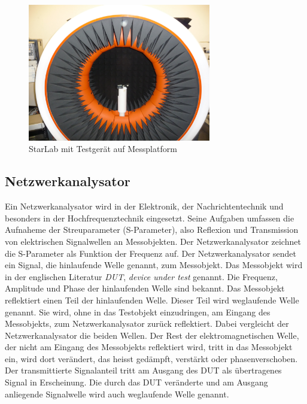 \begin{figure}[!h]
	\centering
	\includegraphics[width=8cm]{content/bilder/Implementierung/StarLab.JPG}%
	\caption{StarLab mit Testgerät auf Messplatform}
	\label{fig:StarLab}
\end{figure}

\subsection{Netzwerkanalysator}
Ein Netzwerkanalysator wird in der Elektronik, der Nachrichtentechnik und besonders in der Hochfrequenztechnik eingesetzt. Seine Aufgaben umfassen die Aufnaheme der Streuparameter (S-Parameter), also Reflexion und Transmission von elektrischen Signalwellen an Messobjekten. Der Netzwerkanalysator zeichnet die S-Parameter als Funktion der Frequenz auf. Der Netzwerkanalysator sendet ein Signal, die  hinlaufende Welle genannt, zum  Messobjekt. Das Messobjekt wird in der englischen Literatur  \textit{DUT}, \textit{device under test} genannt. Die  Frequenz, Amplitude und Phase der hinlaufenden Welle sind bekannt. Das Messobjekt reflektiert einen Teil der hinlaufenden Welle. Dieser Teil wird weglaufende Welle genannt. Sie wird, ohne in das Testobjekt einzudringen, am Eingang des Messobjekts, zum Netzwerkanalysator zurück reflektiert. Dabei vergleicht der Netzwerkanalysator die beiden Wellen. Der Rest der elektromagnetischen Welle, der nicht am Eingang des Messobjekts reflektiert wird, tritt in das Messobjekt ein, wird dort verändert, das heisst gedämpft, verstärkt oder phasenverschoben. Der transmittierte Signalanteil tritt am Ausgang des DUT als übertragenes Signal in Erscheinung. Die durch das DUT veränderte und am Ausgang anliegende Signalwelle wird auch  weglaufende Welle genannt.

